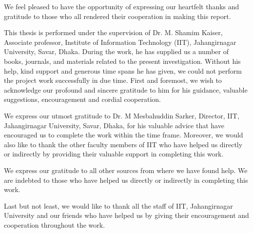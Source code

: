 We feel pleased to have the opportunity of expressing our heartfelt thanks and gratitude to those who all rendered their cooperation in making this report.








This thesis is performed under the supervision of Dr. M. Shamim Kaiser, Associate professor, Institute of Information Technology (IIT), Jahangirnagar University, Savar, Dhaka. During the work, he has supplied us a number of books, journals, and materials related to the present investigation. Without his help, kind support and generous time spans he has given, we could not perform the project work successfully in due time. First and foremost, we wish to acknowledge our profound and sincere gratitude to him for his guidance, valuable suggestions, encouragement and cordial cooperation.

We express our utmost gratitude to Dr. M Mesbahuddin Sarker, Director, IIT, Jahangirnagar University, Savar, Dhaka, for his valuable advice that have encouraged us to complete the work within the time frame. Moreover, we would also like to
thank the other faculty members of IIT who have helped us directly or indirectly by providing their valuable support in completing this work.

We express our gratitude to all other sources from where we have found help. We are indebted to those who have helped us directly or indirectly in completing this work.

Last but not least, we would like to thank all the staff of IIT, Jahangirnagar University and our friends who have helped us by giving their encouragement and cooperation throughout the work.
